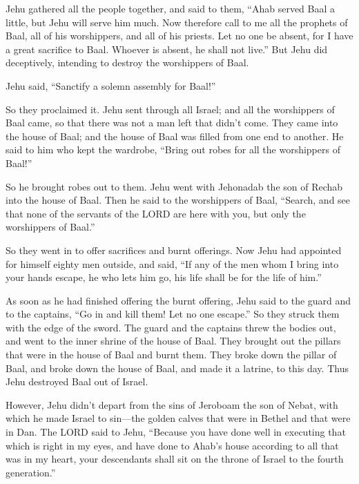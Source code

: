  Jehu gathered all the people together, and said to them,
``Ahab served Baal a little, but Jehu will serve him much.
 Now therefore call to me all the prophets of Baal, all
of his worshippers, and all of his priests. Let no one be absent, for I
have a great sacrifice to Baal. Whoever is absent, he shall not live.''
But Jehu did deceptively, intending to destroy the worshippers of Baal.

 Jehu said, ``Sanctify a solemn assembly for Baal!''

So they proclaimed it.  Jehu sent through all Israel; and
all the worshippers of Baal came, so that there was not a man left that
didn't come. They came into the house of Baal; and the house of Baal was
filled from one end to another.  He said to him who kept
the wardrobe, ``Bring out robes for all the worshippers of Baal!''

So he brought robes out to them.  Jehu went with
Jehonadab the son of Rechab into the house of Baal. Then he said to the
worshippers of Baal, ``Search, and see that none of the servants of the
LORD are here with you, but only the worshippers of Baal.''

 So they went in to offer sacrifices and burnt offerings.
Now Jehu had appointed for himself eighty men outside, and said, ``If
any of the men whom I bring into your hands escape, he who lets him go,
his life shall be for the life of him.''

 As soon as he had finished offering the burnt offering,
Jehu said to the guard and to the captains, ``Go in and kill them! Let
no one escape.'' So they struck them with the edge of the sword. The
guard and the captains threw the bodies out, and went to the inner
shrine of the house of Baal.  They brought out the
pillars that were in the house of Baal and burnt them. 
They broke down the pillar of Baal, and broke down the house of Baal,
and made it a latrine, to this day.  Thus Jehu destroyed
Baal out of Israel.

 However, Jehu didn't depart from the sins of Jeroboam
the son of Nebat, with which he made Israel to sin---the golden calves
that were in Bethel and that were in Dan.  The LORD said
to Jehu, ``Because you have done well in executing that which is right
in my eyes, and have done to Ahab's house according to all that was in
my heart, your descendants shall sit on the throne of Israel to the
fourth generation.''

